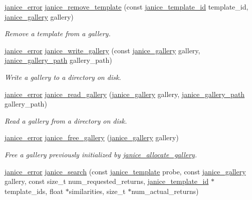 \begin{DoxyCompactItemize}
\hyperlink{group__janice_ga4873d49c1f9d6a6880dfbd485cf6ba72}{janice\+\_\+error} \hyperlink{group__janice_gaf84120b70a7b932ee02ca2f3b131ee54}{janice\+\_\+remove\+\_\+template} (const \hyperlink{group__janice_ga5ec62465fbbc7a92faadfefd3d20e25b}{janice\+\_\+template\+\_\+id} template\+\_\+id, \hyperlink{group__janice_ga08feff1c2835b44332afeda80c3d0fb7}{janice\+\_\+gallery} gallery)
\begin{DoxyCompactList}\small\item\em Remove a template from a gallery. \end{DoxyCompactList}\item 
\hyperlink{group__janice_ga4873d49c1f9d6a6880dfbd485cf6ba72}{janice\+\_\+error} \hyperlink{group__janice_gaf6aa26be058ad0905d9a03d1798835be}{janice\+\_\+write\+\_\+gallery} (const \hyperlink{group__janice_ga08feff1c2835b44332afeda80c3d0fb7}{janice\+\_\+gallery} gallery, \hyperlink{group__janice_gac531556b0a1896b828209fe7fd843b90}{janice\+\_\+gallery\+\_\+path} gallery\+\_\+path)
\begin{DoxyCompactList}\small\item\em Write a gallery to a directory on disk. \end{DoxyCompactList}\item 
\hyperlink{group__janice_ga4873d49c1f9d6a6880dfbd485cf6ba72}{janice\+\_\+error} \hyperlink{group__janice_ga55130671c1d2a7fb607e96134d80da45}{janice\+\_\+read\+\_\+gallery} (\hyperlink{group__janice_ga08feff1c2835b44332afeda80c3d0fb7}{janice\+\_\+gallery} gallery, \hyperlink{group__janice_gac531556b0a1896b828209fe7fd843b90}{janice\+\_\+gallery\+\_\+path} gallery\+\_\+path)
\begin{DoxyCompactList}\small\item\em Read a gallery from a directory on disk. \end{DoxyCompactList}\item 
\hyperlink{group__janice_ga4873d49c1f9d6a6880dfbd485cf6ba72}{janice\+\_\+error} \hyperlink{group__janice_gad059b35e049028060025889a14fe6982}{janice\+\_\+free\+\_\+gallery} (\hyperlink{group__janice_ga08feff1c2835b44332afeda80c3d0fb7}{janice\+\_\+gallery} gallery)
\begin{DoxyCompactList}\small\item\em Free a gallery previously initialized by \hyperlink{group__janice_gad17bd59e58177b5f29f32f418ce77f71}{janice\+\_\+allocate\+\_\+gallery}. \end{DoxyCompactList}\item 
\hyperlink{group__janice_ga4873d49c1f9d6a6880dfbd485cf6ba72}{janice\+\_\+error} \hyperlink{group__janice_ga073aa5f2133223c0b31ac3e78671836a}{janice\+\_\+search} (const \hyperlink{group__janice_ga5593b06e86b90504968c0fc191ee2f3c}{janice\+\_\+template} probe, const \hyperlink{group__janice_ga08feff1c2835b44332afeda80c3d0fb7}{janice\+\_\+gallery} gallery, const size\+\_\+t num\+\_\+requested\+\_\+returns, \hyperlink{group__janice_ga5ec62465fbbc7a92faadfefd3d20e25b}{janice\+\_\+template\+\_\+id} $\ast$template\+\_\+ids, float $\ast$similarities, size\+\_\+t $\ast$num\+\_\+actual\+\_\+returns)

\end{DoxyCompactItemize}
